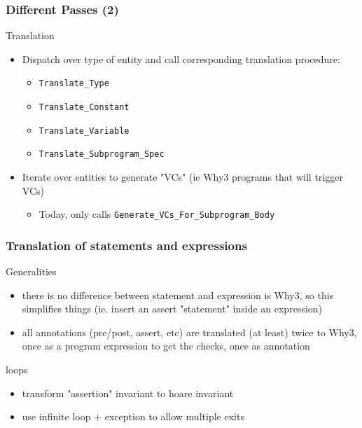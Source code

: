 \documentclass{beamer}
\newenvironment{specialframe}{%
  \begin{frame}[fragile,environment=specialframe]}{\end{frame}}
\begin{document}
\begin{specialframe}\frametitle{Different Passes (2) }
   \begin{block}{Translation}
      \begin{itemize}
         \item Dispatch over type of entity and call corresponding translation
            procedure:
            \begin{itemize}
                  \item \verb|Translate_Type|
                  \item \verb|Translate_Constant|
                  \item \verb|Translate_Variable|
                  \item \verb|Translate_Subprogram_Spec|
            \end{itemize}
         \item Iterate over entities to generate "VCs" (ie Why3 programs that
            will trigger VCs)
            \begin{itemize}
               \item Today, only calls \verb|Generate_VCs_For_Subprogram_Body|
            \end{itemize}
      \end{itemize}
   \end{block}
\end{specialframe}

\begin{specialframe}\frametitle{Translation of statements and expressions}
   \begin{block}{Generalities}
      \begin{itemize}
         \item there is no difference between statement and expression is Why3,
               so this simplifies things (ie. insert an assert "statement"
               inside an expression)
         \item all annotations (pre/post, assert, etc) are translated (at
least) twice to Why3, once as a program expression to get the checks, once as
annotation
      \end{itemize}

   \end{block}

   \begin{block}{loops}
      \begin{itemize}
         \item transform "assertion" invariant to hoare invariant
         \item use infinite loop + exception to allow multiple exits
      \end{itemize}
   \end{block}

\end{specialframe}
\end{document}
